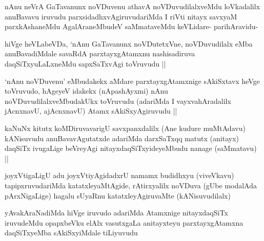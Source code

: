 

\begin{artha}
nAnu neVrA GaTavanunx noVDuvenu athavA noVDuvudilalxveMdu loVkadalilx anuBavavu iruvudu parxsidadhxvAgiruvudariMda I riVti nitayx savxyaM parxkAshaneMdu AgalAraneMbudeV saMmataveMdu keVLidare- parihAravidu-
\end{artha}

\begin{artha}
hiVge heVLabeVDa, `nAnu GaTavanunx noVDutetxVne, noVDuvudilalx eMba anuBavadiMdale savaRdA parxtayxgAtamxnu nashisadiruva daqSiTxyuLaLxneMdu sapxSaTxvAgi toVruvudu ||
\end{artha}


\begin{artha}
`nAnu noVDuvenu' eMbudakekx aMdare parxtayxgAtamxnige sAkiSxtavx heVge toVruvudo, hAgeyeV idakekx (nApashAyxmi) nAnu noVDuvudilalxveMbudakUkx toVruvudu (adariMda I vayxvahAradalilx jAcnxnavU, ajAcnxnavU) Atamx sAkiSxyAgiruvudu ||
\end{artha}

\begin{artha}
kaNuNx kitutx koMDiruvavarigU savxpanxdalilx (Ane kudure muMtAdavu) kANisuvudu anuBavavAgutatxde adariMda darxSaTxqq matutx (anitayx) daqSiTx ivugaLige beVreyAgi nitayxdaqSiTxyideyeMbudu nanage (saMmatavu) ||
\end{artha}


\begin{artha}
joyxVtigaLigU adu joyxVtiyAgidadxrU namamx budidhxyu (viveVkavu) tapipxruvudariMda katatxleyaMtAgide, rAtirxyalilx noVDuva (gUbe modalAda pArxNigaLige) hagalu sUyaRnu katatxleyAgiruvaMte (kANisuvudilalx)
\end{artha}


\begin{artha}
yAvakAraNadiMda hiVge iruvudo adariMda Atamxnige nitayxdaqSiTx iruvudeMdu opapxbeVku elAlx vasutxgaLa anitayxteyu parxtayxgAtamxna daqSiTxyeMba sAkiSxyiMdale tiLiyuvudu
\end{artha}


